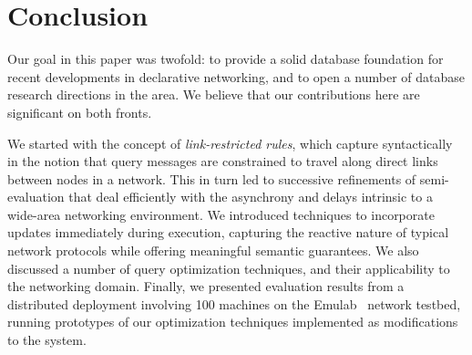 
\section{Conclusion}
\label{sec:conclusion}
\label{sec:futurework}

Our goal in this paper was twofold: to provide a solid database
foundation for recent developments in declarative networking, and to
open a number of database research directions in the area.  We believe
that our contributions here are significant on both fronts.

We started with the concept of \emph{link-restricted rules}, which
capture syntactically in \Dlog the notion that query
messages are constrained to travel along direct links between nodes in
a network.   This in turn led to successive refinements of
semi-\naive evaluation that deal efficiently
with the asynchrony and delays intrinsic to a wide-area networking
environment.  We introduced techniques to incorporate updates
immediately during execution, capturing the reactive nature of
typical network protocols while offering meaningful semantic
guarantees.  We  also discussed a number of
query optimization techniques, and their applicability to the networking
domain.  Finally, we presented evaluation results from a distributed deployment
  involving 100 machines on the Emulab~\cite{emulab} network testbed, running prototypes of our optimization techniques implemented as
  modifications to the \Pitu system.  


